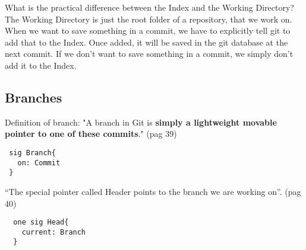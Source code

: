 What is the practical difference between the Index and the Working
Directory? The Working Directory is just the root folder of a repository,
that we work on. When we want to save something in a commit, we have to explicitly 
tell git to add that to the Index. Once added, it
will be saved in the git database at the next commit. If we don't want to save
something in a commit, we simply don't add it to the Index.


\subsection{Branches}
Definition of branch: "A branch in Git is {\bf simply a 
lightweight movable pointer to one of these commits}." \cite{progit} 
(pag 39)

\begin{lstlisting}
 sig Branch{
   on: Commit
 }
\end{lstlisting}

``The special pointer called Header 
points to the branch we are working on''. \cite{progit} (pag 40)

\begin{lstlisting}
  one sig Head{
   	current: Branch
  }
\end{lstlisting}

